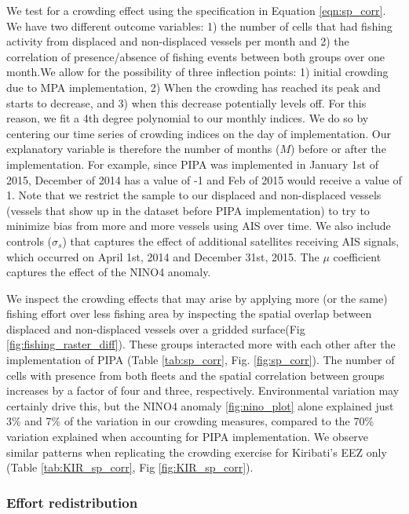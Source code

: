 \documentclass[12pt]{article}
\begin{document}
We test for a crowding effect using the specification in Equation \ref{eqn:sp_corr}. We have two different outcome variables:
1) the number of cells that had fishing activity from displaced and non-displaced vessels per month and 2) the correlation of presence/absence of fishing events between both groups over one month.We allow for the possibility of three inflection points: 1) initial crowding due to MPA implementation, 2) When the crowding has reached its peak and starts to decrease, and 3) when this decrease potentially levels off. For this reason, we fit a 4th degree polynomial to our monthly indices. We do so by centering our time series of crowding indices on the day of implementation. Our explanatory variable is therefore the number of months ($M$) before or after the implementation. For example, since PIPA was implemented in January 1st of 2015, December of 2014 has a value of -1 and Feb of 2015 would receive a value of 1. Note that we restrict the sample to our displaced and non-displaced vessels (vessels that show up in the dataset before PIPA implementation) to try to minimize bias from more and more vessels using AIS over time. We also include controls ($\sigma_s$) that captures the effect of additional satellites receiving AIS signals, which occurred on April 1st, 2014 and December 31st, 2015. The $\mu$ coefficient captures the effect of the NINO4 anomaly.

We inspect the crowding effects that may arise by applying more (or the same) fishing effort over less fishing area by inspecting the spatial overlap between displaced and non-displaced vessels over a gridded surface(Fig \ref{fig:fishing_raster_diff}). These groups interacted more with each other after the implementation of PIPA (Table \ref{tab:sp_corr}, Fig. \ref{fig:sp_corr}). The number of cells with presence from both fleets and the spatial correlation between groups increases by a factor of four and three, respectively. Environmental variation may certainly drive this, but the NINO4 anomaly \ref{fig:nino_plot} alone explained just 3\% and 7\% of the variation in our crowding measures, compared to the 70\% variation explained when accounting for PIPA implementation. We observe similar patterns when replicating the crowding exercise for Kiribati's EEZ only (Table \ref{tab:KIR_sp_corr}, Fig \ref{fig:KIR_sp_corr}).

\subsubsection{Effort redistribution}
\end{document}
